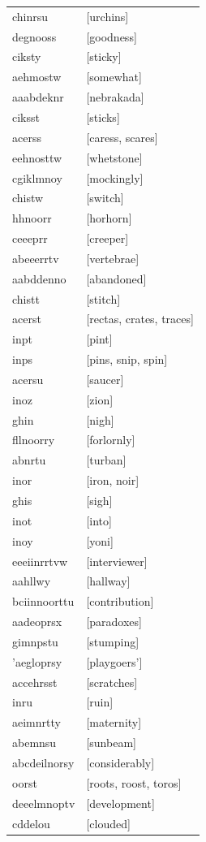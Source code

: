 \documentclass{article}
\begin{document}
\begin{tabular}{ll}
chinrsu & [urchins] \\
degnooss & [goodness] \\
ciksty & [sticky] \\
aehmostw & [somewhat] \\
aaabdeknr & [nebrakada] \\
ciksst & [sticks] \\
acerss & [caress, scares] \\
eehnosttw & [whetstone] \\
cgiklmnoy & [mockingly] \\
chistw & [switch] \\
hhnoorr & [horhorn] \\
ceeeprr & [creeper] \\
abeeerrtv & [vertebrae] \\
aabddenno & [abandoned] \\
chistt & [stitch] \\
acerst & [rectas, crates, traces] \\
inpt & [pint] \\
inps & [pins, snip, spin] \\
acersu & [saucer] \\
inoz & [zion] \\
ghin & [nigh] \\
fllnoorry & [forlornly] \\
abnrtu & [turban] \\
inor & [iron, noir] \\
ghis & [sigh] \\
inot & [into] \\
inoy & [yoni] \\
eeeiinrrtvw & [interviewer] \\
aahllwy & [hallway] \\
bciinnoorttu & [contribution] \\
aadeoprsx & [paradoxes] \\
gimnpstu & [stumping] \\
'aegloprsy & [playgoers'] \\
accehrsst & [scratches] \\
inru & [ruin] \\
aeimnrtty & [maternity] \\
abemnsu & [sunbeam] \\
abcdeilnorsy & [considerably] \\
oorst & [roots, roost, toros] \\
deeelmnoptv & [development] \\
cddelou & [clouded] \\

\end{tabular}
\end{document}
